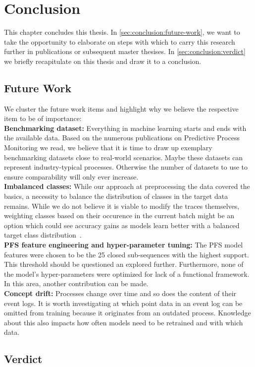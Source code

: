 \chapter{Conclusion} \label{chap:conclusion}
This chapter concludes this thesis. In \autoref{sec:conclusion:future-work}, we want to take the opportunity to elaborate on steps with which to carry this research further in publications or subsequent master thesises. In \autoref{sec:conclusion:verdict} we briefly recapitulate on this thesis and draw it to a conclusion.

\section{Future Work} \label{sec:conclusion:future-work}
We cluster the future work items and highlight why we believe the respective item to be of importance:\\

\textbf{Benchmarking dataset:} Everything in machine learning starts and ends with the available data. Based on the numerous publications on Predictive Process Monitoring we read, we believe that it is time to draw up exemplary benchmarking datasets close to real-world scenarios. Maybe these datasets can represent industry-typical processes. Otherwise the number of datasets to use to ensure comparability will only ever increase.\\

\textbf{Imbalanced classes:} While our approach at preprocessing the data covered the basics, a necessity to balance the distribution of classes in the target data remains. While we do not believe it is viable to modify the traces themselves, weighting classes based on their occurence in the current batch might be an option which could see accuracy gains as models learn better with a balanced target class distribution~\cite{web:stackoverflow-keras-class-weights}.\\

\textbf{PFS feature engineering and hyper-parameter tuning:} The PFS model features  were chosen to be the 25 closed sub-sequences with the highest support. This threshold should be questioned an explored further. Furthermore, none of the model's hyper-parameters were optimized for lack of a functional framework. In this area, another contribution can be made.\\

\textbf{Concept drift:} Processes change over time and so does the content of their event logs. It is worth investigating at which point data in an event log can be omitted from training because it originates from an outdated process. Knowledge about this also impacts how often models need to be retrained and with which data.

\section{Verdict} \label{sec:conclusion:verdict}
